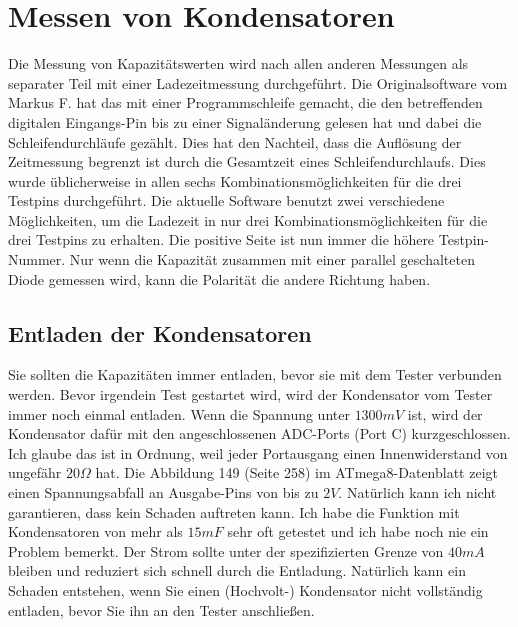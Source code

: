\section{Messen von Kondensatoren}
Die Messung von Kapazitätswerten wird nach allen anderen Messungen als separater Teil mit einer Ladezeitmessung 
durchgeführt.
Die Originalsoftware vom Markus F. hat das mit einer Programmschleife gemacht, die den betreffenden digitalen
Eingangs-Pin bis zu einer Signaländerung gelesen hat und dabei die Schleifendurchläufe gezählt.
Dies hat den Nachteil, dass die Auflösung der Zeitmessung begrenzt ist durch die Gesamtzeit eines Schleifendurchlaufs.
Dies wurde üblicherweise in allen sechs Kombinationsmöglichkeiten für die drei Testpins durchgeführt.
Die aktuelle Software benutzt zwei verschiedene Möglichkeiten, um die Ladezeit in nur drei
Kombinationsmöglichkeiten für die drei Testpins zu erhalten.
Die positive Seite ist nun immer die höhere Testpin-Nummer.
Nur wenn die Kapazität zusammen mit einer parallel geschalteten Diode gemessen wird,
kann die Polarität die andere Richtung haben.

\subsection{Entladen der Kondensatoren}
Sie sollten die Kapazitäten immer entladen, bevor sie mit dem Tester verbunden werden.
Bevor irgendein Test gestartet wird, wird der Kondensator vom Tester immer noch einmal entladen.
Wenn die Spannung unter \(1300mV\) ist, wird der Kondensator dafür mit den angeschlossenen ADC-Ports (Port C) kurzgeschlossen.
Ich glaube das ist in Ordnung, weil jeder Portausgang einen Innenwiderstand von ungefähr \(20\Omega\) hat.
Die Abbildung 149 (Seite 258) im ATmega8-Datenblatt \cite{ATmega8} zeigt einen Spannungsabfall an Ausgabe-Pins von bis zu \(2V\).
Natürlich kann ich nicht garantieren, dass kein Schaden auftreten kann.
Ich habe die Funktion mit Kondensatoren von mehr als \(15mF\) sehr oft getestet und ich habe noch nie ein Problem bemerkt.
Der Strom sollte unter der spezifizierten Grenze von \(40mA\) bleiben und reduziert sich schnell durch die Entladung.
Natürlich kann ein Schaden entstehen, wenn Sie einen (Hochvolt-) Kondensator nicht vollständig entladen, bevor Sie ihn an den Tester anschließen.

